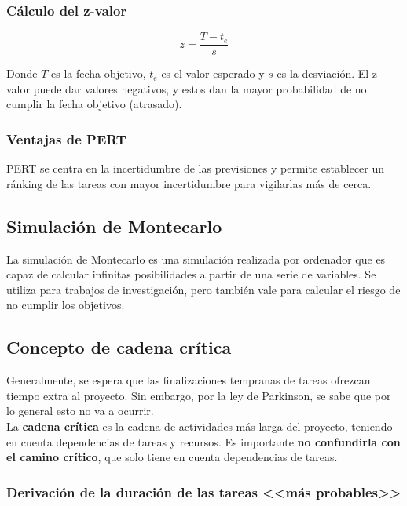 \documentclass[12pt]{article}
\begin{document}
\subsubsection{Cálculo del z-valor}
\label{7.10.6}

\begin{equation}
    z = \frac{T - t_e}{s}
\end{equation}

{Donde $T$ es la fecha objetivo, $t_e$ es el valor esperado y $s$ es la desviación. El z-valor puede dar valores negativos, y estos dan la mayor probabilidad de no cumplir la fecha objetivo (atrasado).}

\subsubsection{Ventajas de PERT}
\label{7.10.7}

{PERT se centra en la incertidumbre de las previsiones y permite establecer un ránking de las tareas con mayor incertidumbre para vigilarlas más de cerca.}

\subsection{Simulación de Montecarlo}
\label{7.11.0}

{La simulación de Montecarlo es una simulación realizada por ordenador que es capaz de calcular infinitas posibilidades a partir de una serie de variables. Se utiliza para trabajos de investigación, pero también vale para calcular el riesgo de no cumplir los objetivos.}

\subsection{Concepto de cadena crítica}
\label{7.12.0}

{Generalmente, se espera que las finalizaciones tempranas de tareas ofrezcan tiempo extra al proyecto. Sin embargo, por la ley de Parkinson, se sabe que por lo general esto no va a ocurrir.} \\

{La \textbf{cadena crítica} es la cadena de actividades más larga del proyecto, teniendo en cuenta dependencias de tareas y recursos. Es importante \textbf{no confundirla con el camino crítico}, que solo tiene en cuenta dependencias de tareas.}

\subsubsection{Derivación de la duración de las tareas <<más probables>>}
\label{7.12.1}
\end{document}
